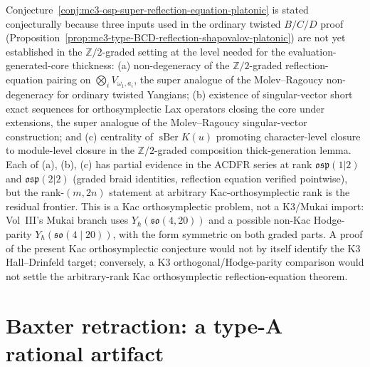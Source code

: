\begin{remark}
\label{rem:mc3-osp-super-reflection-equation-scope}
Conjecture~\ref{conj:mc3-osp-super-reflection-equation-platonic}
is stated conjecturally because three inputs used in the ordinary
twisted $B/C/D$ proof
(Proposition~\ref{prop:mc3-type-BCD-reflection-shapovalov-platonic})
are not yet established in the $\mathbb{Z}/2$-graded setting at
the level needed for the evaluation-generated-core thickness:
(a) non-degeneracy of the $\mathbb{Z}/2$-graded reflection-equation
pairing on $\bigotimes_i V_{\omega_1,a_i}$, the super analogue of
the Molev--Ragoucy non-degeneracy for ordinary twisted Yangians;
(b) existence of singular-vector short exact sequences for
orthosymplectic Lax operators closing the core under extensions,
the super analogue of the Molev--Ragoucy singular-vector
construction; and (c) centrality of $\operatorname{sBer}K(u)$
promoting character-level closure to module-level closure in the
$\mathbb{Z}/2$-graded composition thick-generation lemma. Each
of (a), (b), (c) has partial evidence in the ACDFR series at rank
$\mathfrak{osp}(1|2)$ and $\mathfrak{osp}(2|2)$ (graded braid
identities, reflection equation verified pointwise), but the
rank-$(m,2n)$ statement at arbitrary Kac-orthosymplectic rank is the
residual frontier.  This is a Kac orthosymplectic problem, not a
K3/Mukai import: Vol~III's Mukai branch uses
$Y_\hbar(\mathfrak{so}(4,20))$ and a possible non-Kac Hodge-parity
$Y_\hbar(\mathfrak{so}(4\mid20))$, with the form symmetric on both
graded parts.  A proof of the present Kac orthosymplectic conjecture
would not by itself identify the K3 Hall--Drinfeld target;
conversely, a K3 orthogonal/Hodge-parity comparison would not settle
the arbitrary-rank Kac orthosymplectic reflection-equation theorem.
\end{remark}

\section{Baxter retraction: a type-A rational artifact}
\label{sec:mc3-platonic-baxter-retraction}

